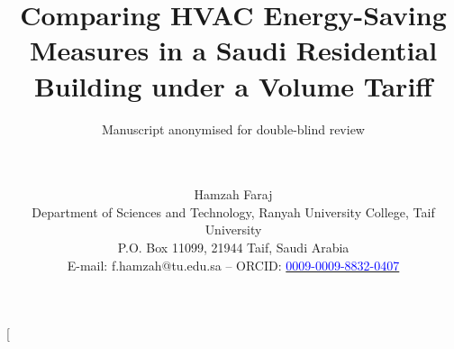 \documentclass[10pt,a4paper,twocolumn]{article}
\title{\bfseries Comparing HVAC Energy-Saving Measures in a Saudi Residential Building under a Volume Tariff}
\author{Manuscript anonymised for double-blind review \\[6pt]
\mbox{}\\ \mbox{}\\[4pt]
\mbox{}}%
\author{Hamzah Faraj \\[6pt]
Department of Sciences and Technology, Ranyah University College, Taif University\\ P.O. Box 11099, 21944 Taif, Saudi Arabia\\[4pt]
E-mail: f.hamzah@tu.edu.sa \; -- \; ORCID: \href{https://orcid.org/0009-0009-8832-0407}{\textcolor{blue}{0009-0009-8832-0407}}}
\date{}
\theoremstyle{definition}
\begin{document}
\nocite{stockmodel2020,passive_saudi2025,retrofit_jeddah2023,braun1990,naderi2022precool,mayes2024precool,sec_tariff,rl2026hvac,ledreau2016flex,reynders2018flex,mousa2016optimal,mousa2017optimal,henzinger_2000,alur2012optimal,wojtczak2013optimal,alur2013safe,nghiem2011green,nghiem2012scalable,drgona2020mpc,kim2022mpcreview,hou2022mpc,dhaliwal2026mpc,zheng2024empc,wang2024mldr,turner2015peak,wang2023precool,braun2003load,morgan2007impact,canet2023flex,arababadi2017precool,ramacuriel2022dlc,oldewurtel2010reducing,matar2017tou,alayed2021thermal,alsanea_insulation2022,alyami2021building,sbc_envelope2021,alhomoud2021review,krarti_peak2022,alaidroos2015envelope,krarti2020ac,almogbel2020inverter,aldubyan_stayhome2022,alshahrani2019smart,hoyt2015setpoint,standard55,ISO7730,tarsheed_setpoint,sbc201_2018,saso2663_2014,saso2663,sbc602_2018,iso13370_2017,iso13790_2008,brown1962natural,ashrae_fund2021,ahri210240,se_tariff2027,crawley2001energyplus,schork2020ipx,huangfu2018highs,goulart2026clarabel,helton2003lhs,marino2008prcc,tian2013review,saltelli2010perfunctory,judkoff2006validation,ashrae140_2023,sec_tou2010}
\twocolumn[
\end{document}
